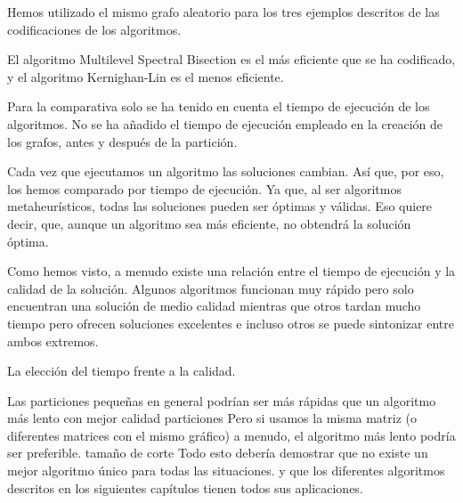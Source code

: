 Hemos utilizado el mismo grafo aleatorio para los tres ejemplos descritos de las codificaciones de los algoritmos.

El algoritmo Multilevel Spectral Bisection es el más eficiente que se ha codificado, y el algoritmo Kernighan-Lin es el menos eficiente.

Para la comparativa solo se ha tenido en cuenta el tiempo de ejecución de los algoritmos. No se ha añadido el tiempo de ejecución empleado en la creación de los grafos, antes y después de la partición.

Cada vez que ejecutamos un algoritmo las soluciones cambian. Así que, por eso, los hemos comparado por tiempo de ejecución. Ya que, al ser algoritmos metaheurísticos, todas las soluciones pueden ser óptimas y válidas. Eso quiere decir, que, aunque un algoritmo sea más eficiente, no obtendrá la solución óptima.

Como hemos visto, a menudo existe una relación entre el tiempo de ejecución y la calidad de la solución. Algunos algoritmos funcionan muy rápido pero solo encuentran una solución de medio calidad mientras que otros tardan mucho tiempo pero ofrecen soluciones excelentes e incluso otros se puede sintonizar entre ambos extremos.

La elección del tiempo frente a la calidad.

Las particiones pequeñas en general podrían ser más rápidas que un algoritmo más lento con mejor calidad
particiones Pero si usamos la misma matriz (o diferentes matrices con el mismo gráfico)
a menudo, el algoritmo más lento podría ser preferible. tamaño de corte
Todo esto debería demostrar que no existe un mejor algoritmo único para todas las situaciones.
y que los diferentes algoritmos descritos en los siguientes capítulos tienen todos sus
aplicaciones.